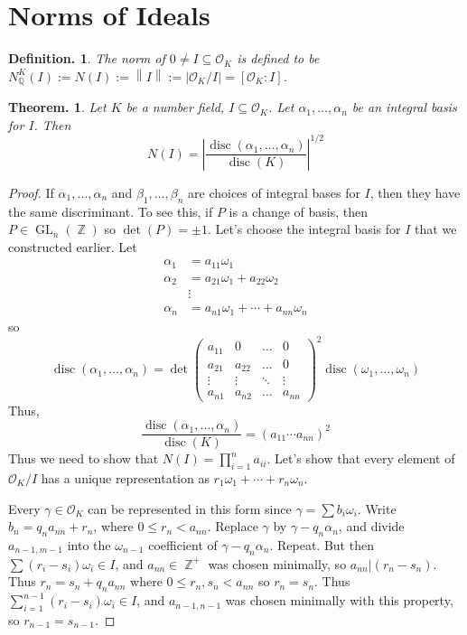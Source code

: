 \documentclass[11pt, a4paper]{memoir}
\DeclareMathOperator{\Q}{{\mathbb{Q}}}
\DeclareMathOperator{\Z}{{\mathbb{Z}}}
\newcommand{\norm}[1]{\ensuremath{\left\lVert#1\right\rVert}}
\theoremstyle{change}
\newtheorem{theorem}{Theorem.}[section]
\theoremstyle{plain}
\theoremstyle{nonumberplain}
\newtheorem{definition}{Definition.}
\newtheorem{proof}{Proof}
\DeclareMathOperator{\disc}{disc}
\DeclareMathOperator{\GL}{GL}
\begin{document}
\section{Norms of Ideals}
\begin{definition}
    The norm of $0\neq I\subseteq\mathcal{O}_K$ is defined to be $N_{\Q}^K(I):=N(I):=\norm{I}:=|\mathcal{O}_K/I|=[\mathcal{O}_K:I]$.
\end{definition}
\begin{theorem}
    Let $K$ be a number field, $I\subseteq\mathcal{O}_K$.
    Let $\alpha_1,\ldots,\alpha_n$ be an integral basis for $I$.
    Then
    \begin{equation*}
        N(I)=\left\lvert\frac{\disc(\alpha_1,\ldots,\alpha_n)}{\disc(K)}\right\rvert^{1/2}
    \end{equation*}
\end{theorem}
\begin{proof}
    If $\alpha_1,\ldots,\alpha_n$ and $\beta_1,\ldots,\beta_n$ are choices of integral bases for $I$, then they have the same discriminant.
    To see this, if $P$ is a change of basis, then $P\in\GL_n(\Z)$ so $\det(P)=\pm 1$.
    Let's choose the integral basis for $I$ that we constructed earlier.
    Let
    \begin{align*}
        \alpha_1 &= a_{11}\omega_1\\
        \alpha_2 &= a_{21}\omega_1+a_{22}\omega_2\\
                 &\vdots\\
        \alpha_n &= a_{n1}\omega_1+\cdots+a_{nn}\omega_n
    \end{align*}
    so
    \begin{equation*}
        \disc(\alpha_1,\ldots,\alpha_n) = \det
        \begin{pmatrix}a_{11}&0&\hdots&0\\a_{21}&a_{22}&\hdots&0\\\vdots&\vdots&\ddots&\vdots\\a_{n1}&a_{n2}&\hdots&a_{nn}\end{pmatrix}^2\disc(\omega_1,\ldots,\omega_n)
    \end{equation*}
    Thus,
    \begin{equation*}
        \frac{\disc(\alpha_1,\ldots,\alpha_n)}{\disc(K)}=(a_{11}\cdots a_{nn})^2
    \end{equation*}
    Thus we need to show that $N(I)=\prod_{i=1}^n a_{ii}$.
    Let's show that every element of $\mathcal{O}_K/I$ has a unique representation as $r_1\omega_1+\cdots+r_n\omega_n$.

    Every $\gamma\in\mathcal{O}_K$ can be represented in this form since $\gamma=\sum b_i\omega_i$.
    Write $b_n=q_na_{nn}+r_n$, where $0\leq r_n<a_{nn}$.
    Replace $\gamma$ by $\gamma-q_n\alpha_n$, and divide $a_{n-1,m-1}$ into the $\omega_{n-1}$ coefficient of $\gamma-q_n\alpha_n$.
    Repeat.
    But then $\sum(r_i-s_i)\omega_i\in I$, and $a_{nn}\in\Z^+$ was chosen minimally, so $a_{nn}|(r_n-s_n)$.
    Thus $r_n=s_n+q_na_{nn}$ where $0\leq r_n,s_n<a_{nn}$ so $r_n=s_n$.
    Thus $\sum_{i=1}^{n-1}(r_i-s_i)\omega_i\in I$, and $a_{n-1,n-1}$ was chosen minimally with this property, so $r_{n-1}=s_{n-1}$.
\end{proof}
\end{document}
